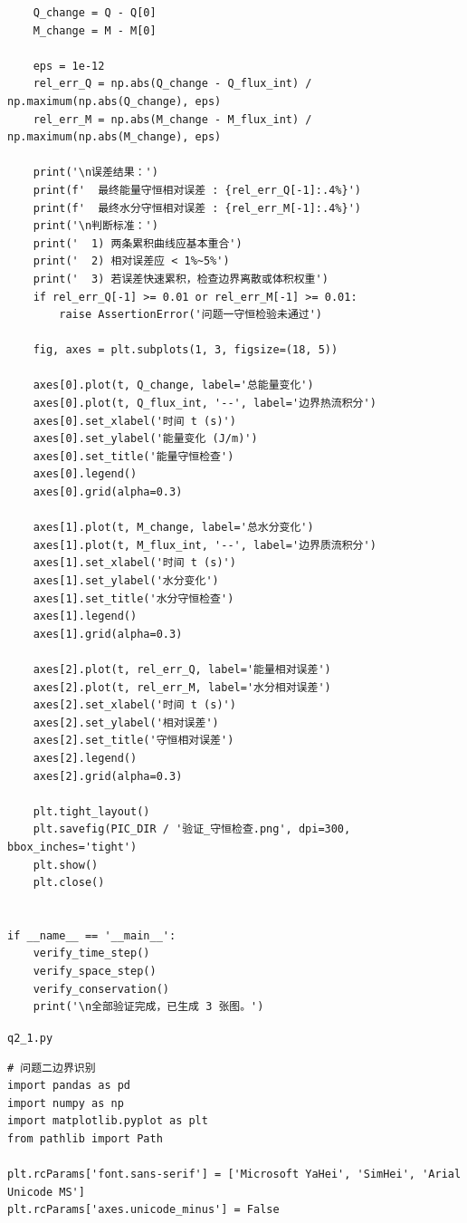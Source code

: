\documentclass[withoutpreface,bwprint]{cumcm_thesis}
\begin{document}
\begin{appendices}
\begin{lstlisting}
    Q_change = Q - Q[0]
    M_change = M - M[0]

    eps = 1e-12
    rel_err_Q = np.abs(Q_change - Q_flux_int) / np.maximum(np.abs(Q_change), eps)
    rel_err_M = np.abs(M_change - M_flux_int) / np.maximum(np.abs(M_change), eps)

    print('\n误差结果：')
    print(f'  最终能量守恒相对误差 : {rel_err_Q[-1]:.4%}')
    print(f'  最终水分守恒相对误差 : {rel_err_M[-1]:.4%}')
    print('\n判断标准：')
    print('  1) 两条累积曲线应基本重合')
    print('  2) 相对误差应 < 1%~5%')
    print('  3) 若误差快速累积，检查边界离散或体积权重')
    if rel_err_Q[-1] >= 0.01 or rel_err_M[-1] >= 0.01:
        raise AssertionError('问题一守恒检验未通过')

    fig, axes = plt.subplots(1, 3, figsize=(18, 5))

    axes[0].plot(t, Q_change, label='总能量变化')
    axes[0].plot(t, Q_flux_int, '--', label='边界热流积分')
    axes[0].set_xlabel('时间 t (s)')
    axes[0].set_ylabel('能量变化 (J/m)')
    axes[0].set_title('能量守恒检查')
    axes[0].legend()
    axes[0].grid(alpha=0.3)

    axes[1].plot(t, M_change, label='总水分变化')
    axes[1].plot(t, M_flux_int, '--', label='边界质流积分')
    axes[1].set_xlabel('时间 t (s)')
    axes[1].set_ylabel('水分变化')
    axes[1].set_title('水分守恒检查')
    axes[1].legend()
    axes[1].grid(alpha=0.3)

    axes[2].plot(t, rel_err_Q, label='能量相对误差')
    axes[2].plot(t, rel_err_M, label='水分相对误差')
    axes[2].set_xlabel('时间 t (s)')
    axes[2].set_ylabel('相对误差')
    axes[2].set_title('守恒相对误差')
    axes[2].legend()
    axes[2].grid(alpha=0.3)

    plt.tight_layout()
    plt.savefig(PIC_DIR / '验证_守恒检查.png', dpi=300, bbox_inches='tight')
    plt.show()
    plt.close()


if __name__ == '__main__':
    verify_time_step()
    verify_space_step()
    verify_conservation()
    print('\n全部验证完成，已生成 3 张图。')

\end{lstlisting}

\noindent\texttt{q2\_1.py}
\begin{lstlisting}
# 问题二边界识别
import pandas as pd
import numpy as np
import matplotlib.pyplot as plt
from pathlib import Path

plt.rcParams['font.sans-serif'] = ['Microsoft YaHei', 'SimHei', 'Arial Unicode MS']
plt.rcParams['axes.unicode_minus'] = False


\end{lstlisting}
\end{appendices}
\end{document}
